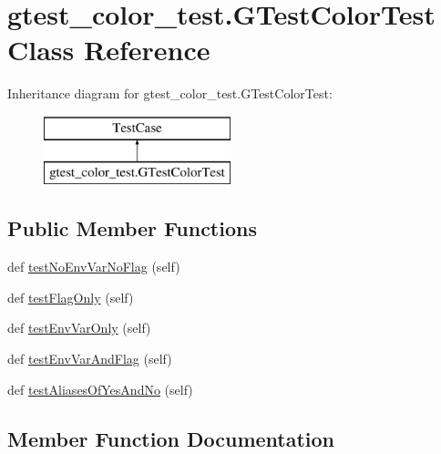 \hypertarget{classgtest__color__test_1_1_g_test_color_test}{}\section{gtest\+\_\+color\+\_\+test.\+G\+Test\+Color\+Test Class Reference}
\label{classgtest__color__test_1_1_g_test_color_test}
Inheritance diagram for gtest\+\_\+color\+\_\+test.\+G\+Test\+Color\+Test\+:\begin{figure}[H]
\begin{center}
\leavevmode
\includegraphics[height=2.000000cm]{classgtest__color__test_1_1_g_test_color_test}
\end{center}
\end{figure}
\subsection*{Public Member Functions}
\begin{DoxyCompactItemize}
\item 
def \hyperlink{classgtest__color__test_1_1_g_test_color_test_a22bf83ab416dc3ccd3c1b771ff74022c}{test\+No\+Env\+Var\+No\+Flag} (self)
\item 
def \hyperlink{classgtest__color__test_1_1_g_test_color_test_abc4c056b8e703e83516f9e5aea8dd25d}{test\+Flag\+Only} (self)
\item 
def \hyperlink{classgtest__color__test_1_1_g_test_color_test_aedb7bbaa0d6acff3628d91a471f4ceb5}{test\+Env\+Var\+Only} (self)
\item 
def \hyperlink{classgtest__color__test_1_1_g_test_color_test_ae88e8ec526135ed1448e83fc4ec7cd15}{test\+Env\+Var\+And\+Flag} (self)
\item 
def \hyperlink{classgtest__color__test_1_1_g_test_color_test_aaf2110e359494dc711e87d29d351dc47}{test\+Aliases\+Of\+Yes\+And\+No} (self)
\end{DoxyCompactItemize}


\subsection{Member Function Documentation}
\hypertarget{classgtest__color__test_1_1_g_test_color_test_aaf2110e359494dc711e87d29d351dc47}{}
